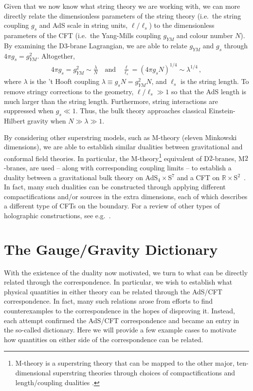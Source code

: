 \documentclass[../PhD.tex]{subfiles}
\begin{document}
Given that we now know what string theory we are working with, we can more directly relate the dimensionless parameters of the string theory (i.e.~the string coupling $g_s$ and AdS scale in string units, $\ell / \ell_s$) to the dimensionless parameters of the CFT (i.e.~the Yang-Mills coupling $g_{YM}$ and colour number $N$). By examining the D3-brane Lagrangian, we are able to relate $g_{YM}$ and $g_s$ through $4\pi g_s = g_{YM}^2$. Altogether,
\begin{align}
\label{params}
4\pi g_s = g_{YM}^2 \sim \frac{\lambda}{N} \quad \text{and} \quad \frac{\ell}{\ell_s} = \left( 4\pi g_s N \right)^{1/4} \sim \lambda^{1/4} \, ,
\end{align}
where $\lambda$ is the 't Hooft coupling $\lambda \equiv g_s N = g_{YM}^2 N$, and $\ell_s$ is the string length. To remove stringy corrections to the geometry, $\ell / \ell_s \gg 1$ so that the AdS length is much larger than the string length. Furthermore, string interactions are suppressed when $g_s \ll 1$. Thus, the bulk theory approaches  classical Einstein-Hilbert gravity when $N \gg \lambda \gg 1$.

By considering other superstring models, such as M-theory (eleven Minkowski dimensions), we are able to establish similar dualities between gravitational and conformal field theories. In particular, the M-theory\footnote{M-theory is a superstring theory that can be mapped to the other major, ten-dimensional superstring theories through choices of compactifications and length/coupling dualities \cite{Polchinski:1998rr}.} equivalent of D$2$-branes, M$2$-branes, are used -- along with corresponding coupling limits -- to establish a duality between a gravitational bulk theory on AdS$_4 \times$S$^7$ and a CFT on {$\mathbb{R}\times$S$^2$}~\cite{hep-th/9711200}. In fact, many such dualities can be constructed through applying different compactifications and/or sources in the extra dimensions, each of which describes a different type of CFTs on the boundary. For a review of other types of holographic constructions, see e.g.~\cite{1612.07324, 1606.08953}.


\section{The Gauge/Gravity Dictionary}
\label{ssec: dictionary}

With the existence of the duality now motivated, we turn to what can be directly related through the correspondence. In particular, we wish to establish what physical quantities in either theory can be related through the AdS/CFT correspondence. In fact, many such relations arose from efforts to find counterexamples to the correspondence in the hopes of disproving it. Instead, each attempt confirmed the AdS/CFT correspondence and became an entry in the so-called dictionary. Here we will provide a few example cases to motivate how quantities on either side of the correspondence can be related.
\end{document}
